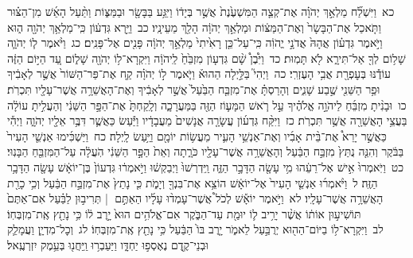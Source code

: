 \documentclass[18pt]{article}
\begin{document}
 {\loc כא~}וַיִּשְׁלַ֞ח מַלְאַ֣ךְ יְהֹוָ֗ה אֶת־קְצֵ֤ה הַמִּשְׁעֶ֙נֶת֙ אֲשֶׁ֣ר בְּיָד֔וֹ וַיִּגַּ֥ע בַּבָּשָׂ֖ר וּבַמַּצּ֑וֹת וַתַּ֨עַל הָאֵ֜שׁ מִן־הַצּ֗וּר וַתֹּ֤אכַל אֶת־הַבָּשָׂר֙ וְאֶת־הַמַּצּ֔וֹת וּמַלְאַ֣ךְ יְהֹוָ֔ה הָלַ֖ךְ מֵעֵינָֽיו׃ \startlock
 {\loc כב~}וַיַּ֣רְא גִּדְע֔וֹן כִּֽי־מַלְאַ֥ךְ יְהֹוָ֖ה ה֑וּא וַיֹּ֣אמֶר גִּדְע֗וֹן אֲהָהּ֙ אֲדֹנָ֣י יֱהֹוִ֔ה כִּֽי־עַל־כֵּ֤ן רָאִ֙יתִי֙ מַלְאַ֣ךְ יְהֹוָ֔ה פָּנִ֖ים אֶל־פָּנִֽים׃ \startlock
 {\loc כג~}וַיֹּ֨אמֶר ל֧וֹ יְהֹוָ֛ה שָׁל֥וֹם לְךָ֖ אַל־תִּירָ֑א לֹ֖א תָּמֽוּת׃ \startlock
 {\loc כד~}וַיִּ֩בֶן֩ שָׁ֨ם גִּדְע֤וֹן מִזְבֵּ֙חַ֙ לַֽיהֹוָ֔ה וַיִּקְרָא־ל֥וֹ יְהֹוָ֖ה שָׁל֑וֹם עַ֚ד הַיּ֣וֹם הַזֶּ֔ה עוֹדֶ֕נּוּ בְּעׇפְרָ֖ת אֲבִ֥י הָעֶזְרִֽי׃ \startlock
 {\loc כה~}וַיְהִי֮ בַּלַּ֣יְלָה הַהוּא֒ וַיֹּ֧אמֶר ל֣וֹ יְהֹוָ֗ה קַ֤ח אֶת־פַּר־הַשּׁוֹר֙ אֲשֶׁ֣ר לְאָבִ֔יךָ וּפַ֥ר הַשֵּׁנִ֖י שֶׁ֣בַע שָׁנִ֑ים וְהָרַסְתָּ֗ אֶת־מִזְבַּ֤ח הַבַּ֙עַל֙ אֲשֶׁ֣ר לְאָבִ֔יךָ וְאֶת־הָאֲשֵׁרָ֥ה אֲשֶׁר־עָלָ֖יו תִּכְרֹֽת׃ \startlock
 {\loc כו~}וּבָנִ֨יתָ מִזְבֵּ֜חַ לַיהֹוָ֣ה אֱלֹהֶ֗יךָ עַ֣ל רֹ֧אשׁ הַמָּע֛וֹז הַזֶּ֖ה בַּמַּעֲרָכָ֑ה וְלָֽקַחְתָּ֙ אֶת־הַפָּ֣ר הַשֵּׁנִ֔י וְהַעֲלִ֣יתָ עוֹלָ֔ה בַּעֲצֵ֥י הָאֲשֵׁרָ֖ה אֲשֶׁ֥ר תִּכְרֹֽת׃ \startlock
 {\loc כז~}וַיִּקַּ֨ח גִּדְע֜וֹן עֲשָׂרָ֤ה אֲנָשִׁים֙ מֵעֲבָדָ֔יו וַיַּ֕עַשׂ כַּאֲשֶׁ֛ר דִּבֶּ֥ר אֵלָ֖יו יְהֹוָ֑ה וַיְהִ֡י כַּאֲשֶׁ֣ר יָרֵא֩ אֶת־בֵּ֨ית אָבִ֜יו וְאֶת־אַנְשֵׁ֥י הָעִ֛יר מֵעֲשׂ֥וֹת יוֹמָ֖ם וַיַּ֥עַשׂ לָֽיְלָה׃ \startlock
 {\loc כח~}וַיַּשְׁכִּ֜ימוּ אַנְשֵׁ֤י הָעִיר֙ בַּבֹּ֔קֶר וְהִנֵּ֤ה נֻתַּץ֙ מִזְבַּ֣ח הַבַּ֔עַל וְהָאֲשֵׁרָ֥ה אֲשֶׁר־עָלָ֖יו כֹּרָ֑תָה וְאֵת֙ הַפָּ֣ר הַשֵּׁנִ֔י הֹֽעֲלָ֔ה עַל־הַמִּזְבֵּ֖חַ הַבָּנֽוּי׃ \startlock
 {\loc כט~}וַיֹּֽאמְרוּ֙ אִ֣ישׁ אֶל־רֵעֵ֔הוּ מִ֥י עָשָׂ֖ה הַדָּבָ֣ר הַזֶּ֑ה וַֽיִּדְרְשׁוּ֙ וַיְבַקְשׁ֔וּ וַיֹּ֣אמְר֔וּ גִּדְעוֹן֙ בֶּן־יוֹאָ֔שׁ עָשָׂ֖ה הַדָּבָ֥ר הַזֶּֽה׃ \startlock
 {\loc ל~}וַיֹּ֨אמְר֜וּ אַנְשֵׁ֤י הָעִיר֙ אֶל־יוֹאָ֔שׁ הוֹצֵ֥א אֶת־בִּנְךָ֖ וְיָמֹ֑ת כִּ֤י נָתַץ֙ אֶת־מִזְבַּ֣ח הַבַּ֔עַל וְכִ֥י כָרַ֖ת הָאֲשֵׁרָ֥ה אֲשֶׁר־עָלָֽיו׃ \startlock
 {\loc לא~}וַיֹּ֣אמֶר יוֹאָ֡שׁ לְכֹל֩ אֲשֶׁר־עָמְד֨וּ עָלָ֜יו הַאַתֶּ֣ם  |  תְּרִיב֣וּן לַבַּ֗עַל אִם־אַתֶּם֙ תּוֹשִׁיע֣וּן אוֹת֔וֹ אֲשֶׁ֨ר יָרִ֥יב ל֛וֹ יוּמַ֖ת עַד־הַבֹּ֑קֶר אִם־אֱלֹהִ֥ים הוּא֙ יָ֣רֶב ל֔וֹ כִּ֥י נָתַ֖ץ אֶֽת־מִזְבְּחֽוֹ׃ \startlock
 {\loc לב~}וַיִּקְרָא־ל֥וֹ בַיּוֹם־הַה֖וּא יְרֻבַּ֣עַל לֵאמֹ֑ר יָ֤רֶב בּוֹ֙ הַבַּ֔עַל כִּ֥י נָתַ֖ץ אֶֽת־מִזְבְּחֽוֹ׃ \startlock
 {\loc לג~}וְכׇל־מִדְיָ֧ן וַעֲמָלֵ֛ק וּבְנֵי־קֶ֖דֶם נֶאֶסְפ֣וּ יַחְדָּ֑ו וַיַּעַבְר֥וּ וַֽיַּחֲנ֖וּ בְּעֵ֥מֶק יִזְרְעֶֽאל׃ \startlock
\end{document}
